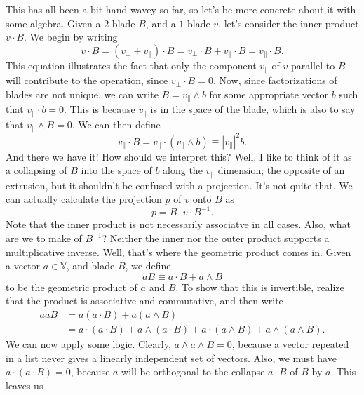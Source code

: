 \documentclass[12pt]{article}
\newcommand{\V}{\mathbb{V}}
\newcommand{\prl}{\parallel}
\newcommand{\prp}{\perp}
\begin{document}
This has all been a bit hand-wavey so far, so let's be more concrete about it with some algebra.
Given a $2$-blade $B$, and a $1$-blade $v$, let's consider the inner product $v\cdot B$.
We begin by writing
\begin{equation}
v\cdot B = (v_{\prp} + v_{\prl})\cdot B = v_{\prp}\cdot B + v_{\prl}\cdot B = v_{\prl}\cdot B.
\end{equation}
This equation illustrates the fact that only the component $v_{\prl}$ of $v$ parallel to $B$ will
contribute to the operation, since $v_{\prp}\cdot B=0$.  Now, since factorizations of blades
are not unique, we can write $B=v_{\prl}\wedge b$ for some appropriate vector $b$ such
that $v_{\prl}\cdot b=0$.
This is because $v_{\prl}$ is in the space of the blade, which is also to say that $v_{\prl}\wedge B=0$.
We can then define
\begin{equation}
v_{\prl}\cdot B = v_{\prl}\cdot(v_{\prl}\wedge b)\equiv |v_{\prl}|^2 b.
\end{equation}
And there we have it!  How should we interpret this?  Well, I like to think of it as a collapsing
of $B$ into the space of $b$ along the $v_{\prl}$ dimension; the opposite of an extrusion, but it shouldn't be
confused with a projection.  It's not quite that.  We can actually calculate the projection $p$
of $v$ onto $B$ as
\begin{equation}
p = B\cdot v\cdot B^{-1}.
\end{equation}
Note that the inner product is not necessarily associatve in all cases.  Also, what are
we to make of $B^{-1}$?  Neither the inner nor the outer product supports a multiplicative
inverse.  Well, that's where the geometric product comes in.  Given a vector $a\in\V$, and blade $B$,
we define
\begin{equation}
aB \equiv a\cdot B + a\wedge B
\end{equation}
to be the geometric product of $a$ and $B$.  To show that this is invertible, realize that the
product is associative and commutative, and then write
\begin{align}
aaB &= a(a\cdot B) + a(a\wedge B) \\
 &= a\cdot (a\cdot B) + a\wedge (a\cdot B) + a\cdot(a\wedge B) + a\wedge(a\wedge B).
\end{align}
We can now apply some logic.  Clearly, $a\wedge a\wedge B=0$, because a vector repeated
in a list never gives a linearly independent set of vectors.  Also, we must have $a\cdot (a\cdot B)=0$,
because $a$ will be orthogonal to the collapse $a\cdot B$ of $B$ by $a$.  This leaves us
\end{document}
